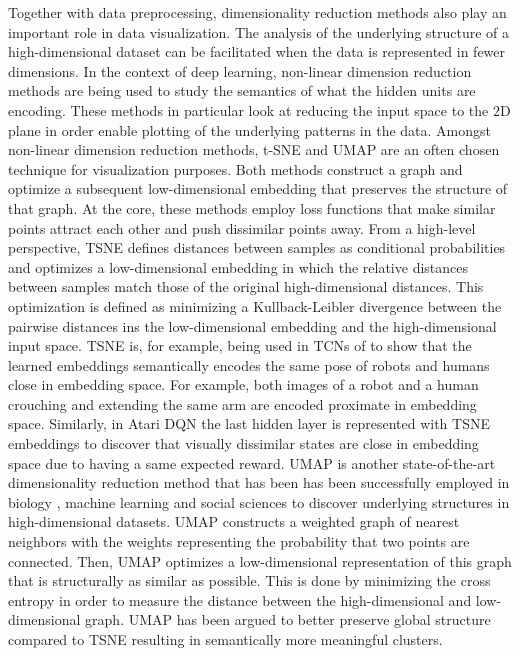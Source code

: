 \documentclass[\home/main.tex]{subfiles}
\begin{document}
Together with data preprocessing, dimensionality reduction methods also play an important role in data visualization. The analysis of the underlying structure of a high-dimensional dataset can be facilitated when the data is represented in fewer dimensions. In the context of deep learning, non-linear dimension reduction methods are being used to study the semantics of what the hidden units are encoding. These methods in particular look at reducing the input space to the $2$D plane in order enable plotting of the underlying patterns in the data. Amongst non-linear dimension reduction methods, t-SNE and UMAP are an often chosen technique for visualization purposes. Both methods construct a graph and optimize a subsequent low-dimensional embedding that preserves the structure of that graph. At the core, these methods employ loss functions that make similar points attract each other and push dissimilar points away. From a high-level perspective, \gls{TSNE} defines distances between samples as conditional probabilities and optimizes a low-dimensional embedding in which the relative distances between samples match those of the original high-dimensional distances. This optimization is defined as minimizing a Kullback-Leibler divergence between the pairwise distances ins the low-dimensional embedding and the high-dimensional input space. \gls{TSNE} is, for example, being used in \glspl{TCN} of \textcite{Sermanet2017TCN} to show that the learned embeddings semantically encodes the same pose of robots and humans close in embedding space. For example, both images of a robot and a human crouching and extending the same arm are encoded proximate in embedding space. Similarly, in Atari DQN \autocite{mnih2015human} the last hidden layer is represented with \gls{TSNE} embeddings to discover that visually dissimilar states are close in embedding space due to having a same expected reward. 
\Gls{UMAP} is another state-of-the-art dimensionality reduction method that has been has been successfully employed in biology \autocite{cao2019single}, machine learning \autocite{carter2019activation} and social sciences \autocite{diaz2019umap} to discover underlying structures in high-dimensional datasets. \Gls{UMAP} constructs a weighted graph of nearest neighbors with the weights representing the probability that two points are connected. Then, UMAP optimizes a low-dimensional representation of this graph that is structurally as similar as possible. This is done by minimizing the cross entropy in order to measure the distance between  the high-dimensional and low-dimensional graph. \gls{UMAP} has been argued to better preserve global structure compared to \gls{TSNE} \autocite{becht2019dimensionality} resulting in semantically more meaningful clusters. 
\end{document}
